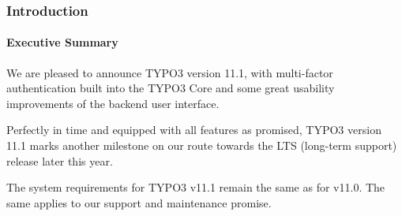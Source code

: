 %

\begin{frame}[fragile]
	\frametitle{Introduction}
	\framesubtitle{Executive Summary}

	\small
		We are pleased to announce TYPO3 version 11.1, with multi-factor
		authentication built into the TYPO3 Core and some great usability
		improvements of the backend user interface.

		\vspace{0.2cm}

		Perfectly in time and equipped with all features as promised, TYPO3
		version 11.1 marks another milestone on our route towards the LTS
		(long-term support) release later this year.

		\vspace{0.2cm}

		The system requirements for TYPO3 v11.1 remain the same as for v11.0.
		The same applies to our support and maintenance promise.

	\normalsize

\end{frame}

